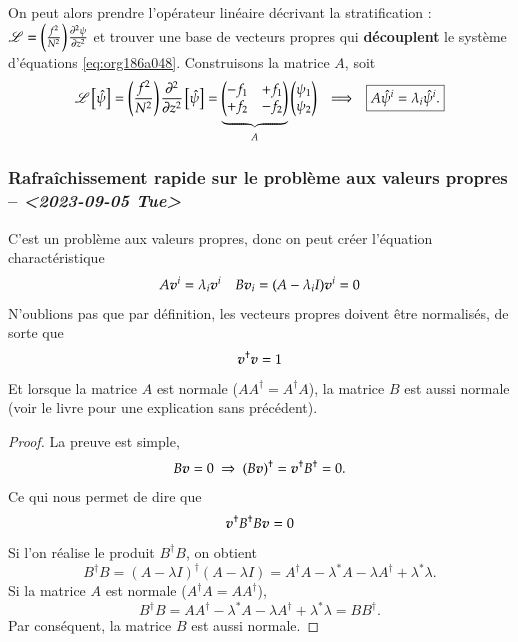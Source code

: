 \documentclass[10pt]{article}
\numberwithin{equation}{section}
\newcommand{\vv}{\vb*{v}}
\newcommand{\pt}{\hspace{1pt}} %
\begin{document}
On peut alors prendre l'opérateur linéaire décrivant la stratification : \(\mathscr{L} = \qty(\frac{f^2}{N^2})\pt\pdv[2]{\psi}{z}\) et trouver une base de vecteurs propres qui \textbf{découplent} le système d'équations \ref{eq:org186a048}.
Construisons la matrice \(A\), soit
\begin{align}
\label{eq:orgc5def9d}
&& \mathscr{L} \pt\qty[ \hat{\psi} ] = \qty(\frac{f^2}{N^2})\pt\pdv[2]{}{z} \pt\qty[\hat{\psi}]= 
   \underbrace{
   \begin{pmatrix}
     -f_1 & +f_1 \\
     +f_2 & -f_2 \\
   \end{pmatrix}}_{A}
   \begin{pmatrix}
     \psi_1 \\
     \psi_2 \\
   \end{pmatrix}
   && \Longrightarrow
   && \boxed{ A \hat{\psi}^i = \lambda_i \hat{\psi}^i. } &&
\end{align}

\subsubsection{Rafraîchissement rapide sur le problème aux valeurs propres -- \textit{<2023-09-05 Tue>}}
\label{sec:org8fafec1}

C'est un problème aux valeurs propres, donc on peut créer l'équation charactéristique
\begin{align}
\label{eq:org36f2375}
   && A \vv^i = \lambda_i \vv^i && B \vv_i = (A - \lambda_i I)\vv^i = 0 &&
\end{align}
N'oublions pas que par définition, les vecteurs propres doivent être normalisés, de sorte que
\begin{equation}
   \vv^\dagger \vv = 1
\end{equation}
Et lorsque la matrice \(A\) est normale (\(AA^\dagger = A^\dagger A\)), la matrice \(B\) est aussi normale (voir le livre \citet*[p.274 pour un résumé sans précédent]{riley_hobson_bence_2006} pour une explication sans précédent).
\begin{proof}
La preuve est simple, 
\begin{equation}
   B\vv = 0 \ \Rightarrow\ (B\vv)^\dagger = \vv^\dagger B^\dagger = 0. 
\end{equation}
Ce qui nous permet de dire que
\begin{equation}
   \vv^\dagger B^\dagger B \vv = 0
\end{equation}
Si l'on réalise le produit $B^\dagger B$, on obtient
\begin{equation}
   B^\dagger B = (A-\lambda I)^\dagger (A-\lambda I) = A^\dagger A - \lambda^* A -\lambda A^\dagger + \lambda^*\lambda.
\end{equation}
Si la matrice $A$ est normale ($A^\dagger A = A A^\dagger$),
\begin{equation}
   B^\dagger B = A A^\dagger - \lambda^* A -\lambda A^\dagger + \lambda^*\lambda = BB^\dagger.
\end{equation}
Par conséquent, la matrice $B$ est aussi normale.
\end{proof}
\end{document}
